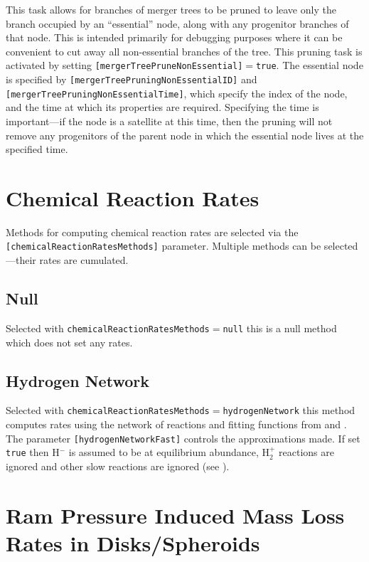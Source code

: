 This task allows for branches of merger trees to be pruned to leave only the branch occupied by an ``essential'' node, along with any progenitor branches of that node. This is intended primarily for debugging purposes where it can be convenient to cut away all non-essential branches of the tree. This pruning task is activated by setting {\tt [mergerTreePruneNonEssential]}$=${\tt true}. The essential node is specified by {\tt [mergerTreePruningNonEssentialID]} and {\tt [mergerTreePruningNonEssentialTime]}, which specify the index of the node, and the time at which its properties are required. Specifying the time is important---if the node is a satellite at this time, then the pruning will not remove any progenitors of the parent node in which the essential node lives at the specified time.

\section{Chemical Reaction Rates}\label{sec:ChemicalReactionRates}

Methods for computing chemical reaction rates are selected via the {\tt [chemicalReactionRatesMethods]} parameter. Multiple methods can be selected---their rates are cumulated.

\subsection{Null}

Selected with {\tt chemicalReactionRatesMethods}$=${\tt null} this is a null method which does not set any rates.

\subsection{Hydrogen Network}

Selected with {\tt chemicalReactionRatesMethods}$=${\tt hydrogenNetwork} this method computes rates using the network of reactions and fitting functions from \cite{abel_modeling_1997} and \cite{tegmark_small_1997}. The parameter {\tt [hydrogenNetworkFast]} controls the approximations made. If set {\tt true} then H$^-$ is assumed to be at equilibrium abundance, H$_2^+$ reactions are ignored and other slow reactions are ignored (see \citealt{abel_modeling_1997}).

\section{Ram Pressure Induced Mass Loss Rates in Disks/Spheroids}\label{sec:RamPressureMassLossRates}

